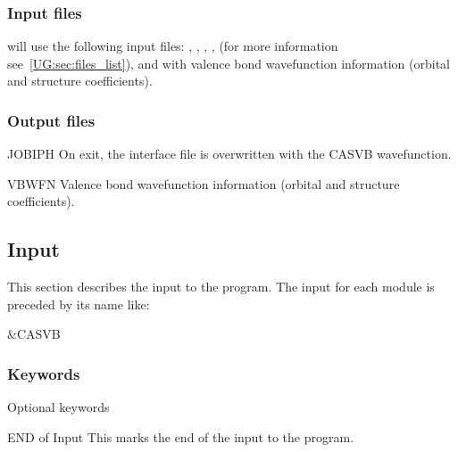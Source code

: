 \subsubsection{Input files}
 will use the following input
files: , , , ,
(for more information see~\ref{UG:sec:files_list}), and
 with
valence bond wavefunction information (orbital and structure coefficients).

\subsubsection{Output files}
\begin{filelist}
\item[JOBIPH]
On exit, the  interface file is overwritten with the
CASVB wavefunction.
\item[VBWFN]
Valence bond wavefunction information (orbital and structure coefficients).
\end{filelist}

\subsection{Input}
\label{UG:sec:casvb_input}

This section describes the input to the  program.
The input for each module is preceded by its name like:
\begin{inputlisting}
 &CASVB
\end{inputlisting}

\subsubsection{Keywords}

Optional keywords
\begin{keywordlist}
\item[END of Input]
This marks the end of the input to the program.
\end{keywordlist}


